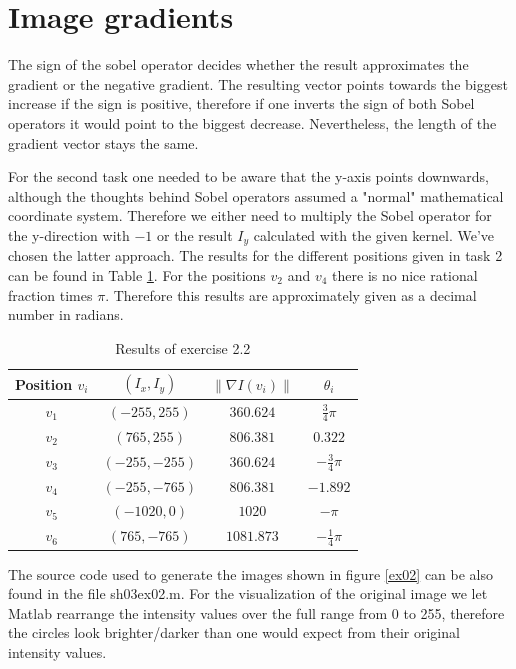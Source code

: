 \documentclass{article}
\newcommand{\norm}[1]{\left\lVert#1\right\rVert}
\begin{document}
\clearpage
\section{Image gradients}
The sign of the sobel operator decides whether the result approximates the gradient or the negative gradient. The resulting vector points towards the biggest increase if the sign is positive, therefore if one inverts the sign of both Sobel operators it would point to the biggest decrease. Nevertheless, the length of the gradient vector stays the same.

For the second task one needed to be aware that the y-axis points downwards, although the thoughts behind Sobel operators assumed a "normal" mathematical coordinate system. Therefore we either need to multiply the Sobel operator for the y-direction with $-1$ or the result $I_y$ calculated with the given kernel. We've chosen the latter approach. The results for the different positions given in task 2 can be found in Table \ref{tab1}. For the positions $v_2$ and $v_4$ there is no nice rational fraction times $\pi$. Therefore this results are approximately given as a decimal number in radians.

\begin{table}[H]
  \centering
  \label{tab1}
  \caption{Results of exercise 2.2}
  \begin{tabular}{cccc}
    \toprule
    Position $v_i$ & $(I_x, I_y)$   & $\norm{\nabla I(v_i)}$ & $\theta_i$        \\
    \midrule
    $v_1$          & $(-255, 255)$  & $360.624$              & $\frac{3}{4}\pi$  \\
    $v_2$          & $(765, 255)$   & $806.381$              & $0.322$           \\
    $v_3$          & $(-255, -255)$ & $360.624$              & $-\frac{3}{4}\pi$ \\
    $v_4$          & $(-255, -765)$ & $806.381$              & $-1.892$          \\
    $v_5$          & $(-1020, 0)$   & $1020$                 & $-\pi$            \\
    $v_6$          & $(765, -765)$  & $1081.873$             & $-\frac{1}{4}\pi$ \\
    \bottomrule
  \end{tabular}
\end{table}

The source code used to generate the images shown in figure \ref{ex02} can be also found in the file sh03ex02.m. For the visualization of the original image we let Matlab rearrange the intensity values over the full range from 0 to 255, therefore the circles look brighter/darker than one would expect from their original intensity values.
\end{document}
